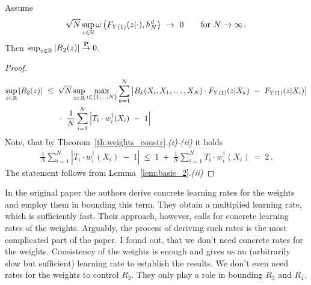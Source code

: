 \begin{lemma}
  Assume
  \begin{align*}
    \sqrt{N}
    \sup_{z\in\R}
    \omega
    \left( 
      F_{Y(1)}(z|\cdot)
      ,h_N^d
    \right)
    \ 
    \to 
    \ 
    0
    \qquad
    \text{for}\ 
    N\to\infty
    \,.
  \end{align*}
  Then $\sup_{z\in\mathbb{R}}|R_2(z)|\overset{\mathbf{P}}{\to} 0$.
\end{lemma}
\begin{proof}
  \begin{align*}
    \sup_{z\in\R}
    \left| R_2(z) \right|
    &
    \  
    \le
    \  
        \sqrt{N}
        \sup_{z\in\R}
        \max_{i\in \left\{ 1,\ldots,N \right\}}
        \sum_{k=1}^{N}
            \left|
        B_k(X_i,X_1,\ldots,X_N)
        \cdot
        F_{Y(1)}(z|X_k)
            \ 
            -
            \ 
        F_{Y(1)}(z|X_i)
            \right|
            \\
            &
            \qquad
            \cdot
            \ 
    \frac{1}{N}
    \sum_{i=1}^{N} 
      \left| 
    T_i\cdot w^\dagger_i(X_i) 
    \ 
    -
    \ 
    1 
      \right|
  \end{align*}
  Note, that by Theorem~\ref{th:weights_constr}.\textit{(i)-(ii)}
  it holds
  \begin{align*}
    \frac{1}{N}
    \sum_{i=1}^{N} 
      \left| 
    T_i\cdot w^\dagger_i(X_i) 
    \ 
    -
    \ 
    1 
      \right|
      \ 
    \le
      \ 
    1
    \ 
    +
    \ 
    \frac{1}{N}
    \sum_{i=1}^{N} 
    T_i\cdot w^\dagger_i(X_i) 
    \ 
    =
    \ 
    2
    \,.
  \end{align*}
  The statement follows from Lemma~\ref{lem:basis_2}.\textit{(ii)}
\end{proof}
\begin{remark}
In the original paper \cite{Wang2019} the authors derive concrete learning rates for the weights and employ them in bounding this term. They obtain a multiplied learning rate, which is sufficiently fast. Their approach, however, calls for concrete learning rates of the weights. Arguably, the process of deriving such rates is the most complicated part of the paper. 
I found out, that we don't need concrete rates for the weights. 
Consistency of the weights is enough and gives us an (arbitrarily slow but sufficient) learning rate to establish the results.
We don't even need rates for the weights to control $R_2$.
They only play a role in bounding $R_3$ and $R_4$.
\end{remark}


